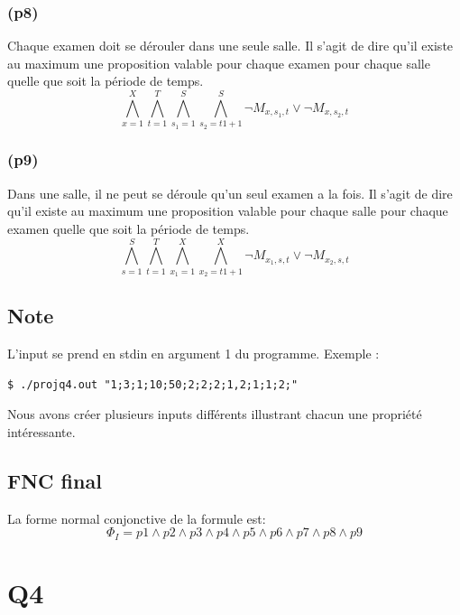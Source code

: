 \documentclass[a4paper,11pt]{article}
\begin{document}
\subsubsection{(p8)}
Chaque examen doit se dérouler dans une seule salle.
Il s'agit de dire qu'il existe au maximum une proposition valable pour chaque examen pour chaque salle quelle que soit la période de temps.
\begin{displaymath}
\bigwedge\limits_{x=1}^{X}\bigwedge\limits_{t=1}^{T}\bigwedge\limits_{s_{1}=1}^{S}\bigwedge\limits_{s_{2}=t1+1}^{S} \neg M_{x, s_{1}, t} \vee \neg M_{x, s_{2}, t}
\end{displaymath}

\subsubsection{(p9)}
Dans une salle, il ne peut se déroule qu'un seul examen a la fois.
Il s'agit de dire qu'il existe au maximum une proposition valable pour chaque salle pour chaque examen quelle que soit la période de temps.
\begin{displaymath}
\bigwedge\limits_{s=1}^{S}\bigwedge\limits_{t=1}^{T}\bigwedge\limits_{x_{1}=1}^{X}\bigwedge\limits_{x_{2}=t1+1}^{X} \neg M_{x_{1}, s, t} \vee \neg M_{x_{2}, s, t}
\end{displaymath}

\subsection{Note}
L'input se prend en stdin en argument 1 du programme. Exemple :

\begin{lstlisting}
$ ./projq4.out "1;3;1;10;50;2;2;2;1,2;1;1;2;"
\end{lstlisting}

Nous avons créer plusieurs inputs différents illustrant chacun une propriété intéressante.

\subsection{FNC final}
La forme normal conjonctive de la formule est:
\begin{displaymath}
\Phi_{I} = p1 \wedge p2 \wedge p3 \wedge p4 \wedge p5 \wedge p6 \wedge p7 \wedge p8 \wedge p9
\end{displaymath}

\section{Q4}
\end{document}
